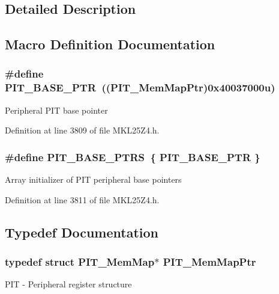 \subsection{Detailed Description}


\subsection{Macro Definition Documentation}
\subsubsection[{\texorpdfstring{P\+I\+T\+\_\+\+B\+A\+S\+E\+\_\+\+P\+TR}{PIT_BASE_PTR}}]{\setlength{\rightskip}{0pt plus 5cm}\#define P\+I\+T\+\_\+\+B\+A\+S\+E\+\_\+\+P\+TR~(({\bf P\+I\+T\+\_\+\+Mem\+Map\+Ptr})0x40037000u)}\hypertarget{group___p_i_t___peripheral_ga70be45f58402a8e6d2ce4df7b23aa41c}{}\label{group___p_i_t___peripheral_ga70be45f58402a8e6d2ce4df7b23aa41c}
Peripheral P\+IT base pointer 

Definition at line 3809 of file M\+K\+L25\+Z4.\+h.

\subsubsection[{\texorpdfstring{P\+I\+T\+\_\+\+B\+A\+S\+E\+\_\+\+P\+T\+RS}{PIT_BASE_PTRS}}]{\setlength{\rightskip}{0pt plus 5cm}\#define P\+I\+T\+\_\+\+B\+A\+S\+E\+\_\+\+P\+T\+RS~\{ {\bf P\+I\+T\+\_\+\+B\+A\+S\+E\+\_\+\+P\+TR} \}}\hypertarget{group___p_i_t___peripheral_ga403e0ed71b80cfe3e085fe6b56b5eff0}{}\label{group___p_i_t___peripheral_ga403e0ed71b80cfe3e085fe6b56b5eff0}
Array initializer of P\+IT peripheral base pointers 

Definition at line 3811 of file M\+K\+L25\+Z4.\+h.



\subsection{Typedef Documentation}
\subsubsection[{\texorpdfstring{P\+I\+T\+\_\+\+Mem\+Map\+Ptr}{PIT_MemMapPtr}}]{\setlength{\rightskip}{0pt plus 5cm}typedef struct {\bf P\+I\+T\+\_\+\+Mem\+Map}$\ast$ {\bf P\+I\+T\+\_\+\+Mem\+Map\+Ptr}}\hypertarget{group___p_i_t___peripheral_ga4efe9d2676c775562cb282254af9a937}{}\label{group___p_i_t___peripheral_ga4efe9d2676c775562cb282254af9a937}
P\+IT -\/ Peripheral register structure 